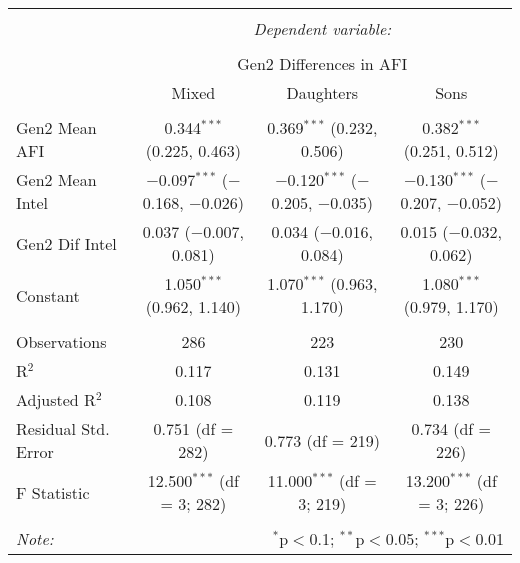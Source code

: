 
\begingroup 
\small 
\begin{tabular}{@{\extracolsep{1pt}}lccc} 
\\[-1.8ex]\hline 
\hline \\[-1.8ex] 
 & \multicolumn{3}{c}{\textit{Dependent variable:}} \\ 
\cline{2-4} 
\\[-1.8ex] & \multicolumn{3}{c}{Gen2 Differences in AFI} \\ 
 & Mixed & Daughters & Sons \\ 
\hline \\[-1.8ex] 
 Gen2 Mean AFI & 0.344$^{***}$ (0.225, 0.463) & 0.369$^{***}$ (0.232, 0.506) & 0.382$^{***}$ (0.251, 0.512) \\ 
  Gen2 Mean Intel & $-$0.097$^{***}$ ($-$0.168, $-$0.026) & $-$0.120$^{***}$ ($-$0.205, $-$0.035) & $-$0.130$^{***}$ ($-$0.207, $-$0.052) \\ 
  Gen2 Dif Intel & 0.037 ($-$0.007, 0.081) & 0.034 ($-$0.016, 0.084) & 0.015 ($-$0.032, 0.062) \\ 
  Constant & 1.050$^{***}$ (0.962, 1.140) & 1.070$^{***}$ (0.963, 1.170) & 1.080$^{***}$ (0.979, 1.170) \\ 
 \hline \\[-1.8ex] 
Observations & 286 & 223 & 230 \\ 
R$^{2}$ & 0.117 & 0.131 & 0.149 \\ 
Adjusted R$^{2}$ & 0.108 & 0.119 & 0.138 \\ 
Residual Std. Error & 0.751 (df = 282) & 0.773 (df = 219) & 0.734 (df = 226) \\ 
F Statistic & 12.500$^{***}$ (df = 3; 282) & 11.000$^{***}$ (df = 3; 219) & 13.200$^{***}$ (df = 3; 226) \\ 
\hline 
\hline \\[-1.8ex] 
\textit{Note:}  & \multicolumn{3}{r}{$^{*}$p$<$0.1; $^{**}$p$<$0.05; $^{***}$p$<$0.01} \\ 
\end{tabular} 
\endgroup 
